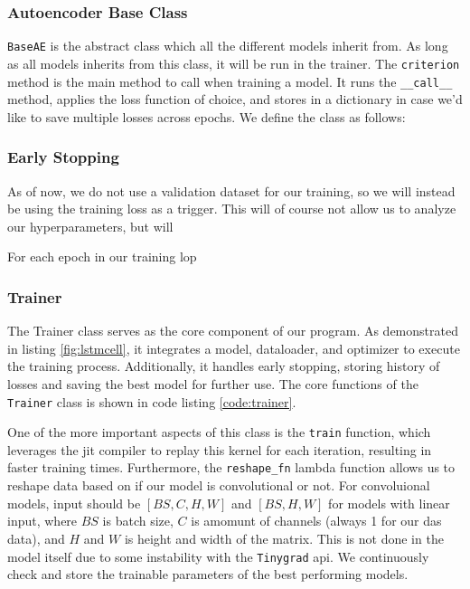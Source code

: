 \subsubsection{Autoencoder Base Class}

\lstinline{BaseAE} is the abstract class which all the different models inherit from. As long as all models inherits from this class, it will be run in the trainer. The \lstinline{criterion} method is the main method to call when training a model. It runs the \lstinline{__call__} method, applies the loss function of choice, and stores in a dictionary in case we'd like to save multiple losses across epochs. We define the class as follows:



\subsubsection{Early Stopping}

As of now, we do not use a validation dataset for our training, so we will instead be using the training loss as a trigger. This will of course not allow us to analyze our hyperparameters, but will 



For each epoch in our training lop

\subsubsection{Trainer}

The Trainer class serves as the core component of our program. As demonstrated in listing \ref{fig:lstmcell}, it integrates a model, dataloader, and optimizer to execute the training process. Additionally, it handles early stopping, storing history of losses and saving the best model for further use. The core functions of the \texttt{Trainer} class is shown in code listing \ref{code:trainer}.



One of the more important aspects of this class is the \texttt{train} function, which leverages the \acrshort{jit} compiler to replay this kernel for each iteration, resulting in faster training times. Furthermore, the \texttt{reshape\_fn} lambda function allows us to reshape data based on if our model is convolutional or not. For convoluional models, input should be $[BS, C, H, W]$ and $[BS, H, W]$ for models with linear input, where $BS$ is batch size, $C$ is amomunt of channels (always 1 for our \acrshort{das} data), and $H$ and $W$ is height and width of the matrix. This is not done in the model itself due to some instability with the \texttt{Tinygrad} \acrshort{api}. We continuously check and store the trainable parameters of the best performing models.


